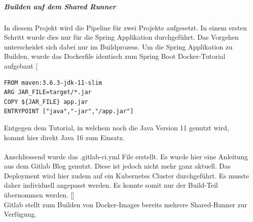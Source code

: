 \subparagraph{Builden auf dem Shared Runner}
In diesem Projekt wird die Pipeline für zwei Projekte aufgesetzt. In einem ersten Schritt wurde dies nur für die Spring Applikation durchgeführt. 
Das Vorgehen unterscheidet sich dabei nur im Buildprozess. 
Um die Spring Applikation zu Builden, wurde das Dockerfile identisch zum Spring Boot Docker-Tutorial aufgebaut [\cite{springBootDocker}

\begin{verbatim}
FROM maven:3.6.3-jdk-11-slim
ARG JAR_FILE=target/*.jar
COPY ${JAR_FILE} app.jar
ENTRYPOINT ["java","-jar","/app.jar"]
\end{verbatim}
Entgegen dem Tutorial, in welchem noch die Java Version 11 genutzt wird, kommt hier direkt Java 16 zum Einsatz. \\\\
Anschliessend wurde das .gitlab-ci.yml File erstellt. Es wurde hier eine Anleitung aus dem Gitlab Blog genutzt. Diese ist jedoch nicht mehr ganz aktuell. Das Deployment wird hier zudem auf ein Kubernetes Cluster durchgeführt. Es musste daher individuell angepasst werden. Es konnte somit nur der Build-Teil übernommen werden. [\cite{springBootCI}]\\
Gitlab stellt zum Builden von Docker-Images bereits mehrere Shared-Runner zur Verfügung. 
